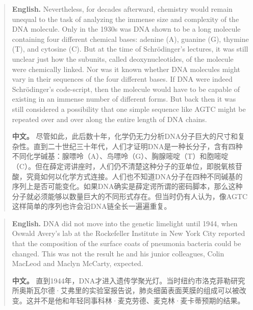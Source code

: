 \begin{quote}
\noindent\textbf{English.} Nevertheless, for decades afterward, chemistry would remain unequal to the task of analyzing the immense size and complexity of the DNA molecule. Only in the 1930s was DNA shown to be a long molecule containing four different chemical bases: adenine (A), guanine (G), thymine (T), and cytosine (C). But at the time of Schrödinger's lectures, it was still unclear just how the subunits, called deoxynucleotides, of the molecule were chemically linked. Nor was it known whether DNA molecules might vary in their sequences of the four different bases. If DNA were indeed Schrödinger's code-script, then the molecule would have to be capable of existing in an immense number of different forms. But back then it was still considered a possibility that one simple sequence like AGTC might be repeated over and over along the entire length of DNA chains.

\smallskip
\noindent\textbf{中文。} 尽管如此，此后数十年，化学仍无力分析DNA分子巨大的尺寸和复杂性。直到二十世纪三十年代，人们才证明DNA是一种长分子，含有四种不同化学碱基：腺嘌呤（A）、鸟嘌呤（G）、胸腺嘧啶（T）和胞嘧啶（C）。但在薛定谔讲座时，人们仍不清楚这种分子的亚单位，即脱氧核苷酸，究竟如何以化学方式连接。人们也不知道DNA分子在四种不同碱基的序列上是否可能变化。如果DNA确实是薛定谔所谓的密码脚本，那么这种分子就必须能够以数量巨大的不同形式存在。但当时仍有人认为，像AGTC这样简单的序列也许会沿DNA链全长一遍遍重复。
\end{quote}

\begin{quote}
\noindent\textbf{English.} DNA did not move into the genetic limelight until 1944, when Oswald Avery's lab at the Rockefeller Institute in New York City reported that the composition of the surface coats of pneumonia bacteria could be changed. This was not the result he and his junior colleagues, Colin MacLeod and Maclyn McCarty, expected.

\smallskip
\noindent\textbf{中文。} 直到1944年，DNA才进入遗传学聚光灯。当时纽约市洛克菲勒研究所奥斯瓦尔德·艾弗里的实验室报告说，肺炎细菌表面荚膜的组成可以被改变。这并不是他和年轻同事科林·麦克劳德、麦克林·麦卡蒂预期的结果。
\end{quote}

